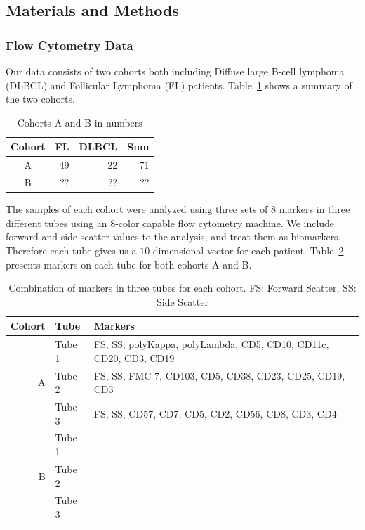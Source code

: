 \subsection{Materials and Methods}
\subsubsection{Flow Cytometry Data}
Our data consists of two cohorts both including Diffuse large B-cell lymphoma (DLBCL) and Follicular Lymphoma (FL) patients. Table~\ref{tbl:fcs-qa-cohorts} shows a summary of the two cohorts.

\begin{table}[!ht]
  \centering
  \begin{tabular}{crrr}
    Cohort & FL & DLBCL & Sum \\ \hline
    A & 49 & 22 & 71 \\
    B & ?? & ?? & ??
  \end{tabular}
  \caption{Cohorts A and B in numbers}
  \label{tbl:fcs-qa-cohorts}
\end{table}

The samples of each cohort were analyzed using three sets of 8 markers in three different tubes using an 8-color capable flow cytometry machine. We include forward and side scatter values to the analysis, and treat them as biomarkers. Therefore each tube gives us a $10$ dimensional vector for each patient. Table~\ref{tbl:fcs-qa-markers} presents markers on each tube for both cohorts A and B.

\begin{table}[!ht]
  \centering
  \begin{tabular}{rlm{7cm}}
    Cohort & Tube & Markers \\ \hline
    & Tube 1 & FS, SS, polyKappa, polyLambda, CD5, CD10, CD11c, CD20, CD3, CD19 \\
    A & Tube 2 & FS, SS, FMC-7, CD103, CD5, CD38, CD23, CD25, CD19, CD3 \\
    & Tube 3 & FS, SS, CD57, CD7, CD5, CD2, CD56, CD8, CD3, CD4 \\ \hline
     & Tube 1 &  \\
    B & Tube 2 &  \\
     & Tube 3 &  \\
  \end{tabular}
  \caption{Combination of markers in three tubes for each cohort. FS: Forward Scatter, SS: Side Scatter}
  \label{tbl:fcs-qa-markers}
\end{table}


